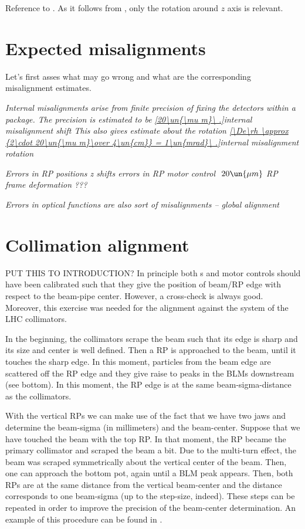 Reference to .
As it follows from , only the rotation around $z$ axis is relevant.

\section[al exp misal]{Expected misalignments}

Let's first asses what may go wrong and what are the corresponding misalignment estimates.

\noindent\em{Internal misalignments} arise from finite precision of fixing the detectors within a package. The precision is estimated to be
\eqref{20\un{\mu m}\ .}{internal misalignment shift}
This also gives estimate about the rotation
\eqref{\De\rh \approx {2\cdot 20\un{\mu m}\over 4\un{cm}} = 1\un{mrad}\ .}{internal misalignment rotation}

\noindent\em{Errors in RP positions}
\> z shifts
\> errors in RP motor control $~20\un{\mu m}$
\> RP frame deformation ???

\noindent\em{Errors in optical functions} are also sort of misalignments -- global alignment


\section[al collim]{Collimation alignment}

PUT THIS TO INTRODUCTION? In principle both s and  motor controls should have been calibrated such that they give the position of beam/RP edge with respect to the beam-pipe center. However, a cross-check is always good. Moreover, this exercise was needed for the alignment against the system of the LHC collimators.

In the beginning, the collimators scrape the beam such that its edge is sharp and its size and center is well defined. Then a RP is approached to the beam, until it touches the sharp edge. In this moment, particles from the beam edge are scattered off the RP edge and they give raise to peaks in the BLMs downstream (see  bottom). In this moment, the RP edge is at the same beam-sigma-distance as the collimators.

With the vertical RPs we can make use of the fact that we have two jaws and determine the beam-sigma (in millimeters) and the beam-center. Suppose that we have touched the beam with the top RP. In that moment, the RP became the primary collimator and scraped the beam a bit. Due to the multi-turn effect, the beam was scraped symmetrically about the vertical center of the beam. Then, one can approach the bottom pot, again until a BLM peak appears. Then, both RPs are at the same distance from the vertical beam-center and the distance corresponds to one beam-sigma (up to the step-size, indeed). These steps can be repeated in order to improve the precision of the beam-center determination. An example of this procedure can be found in .

